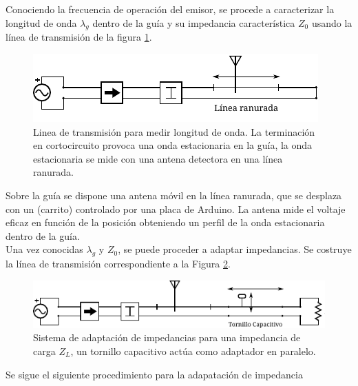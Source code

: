 \documentclass[11pt,a4paper]{article}
\begin{document}
\begin{multicols}{2}
Conociendo la frecuencia de operación del emisor, se procede a caracterizar la longitud de onda $\lambda_g$ dentro de la guía y su impedancia característica $Z_0$ usando la línea de transmisión de la figura \ref{fig:arr2}.\\ 

\begin{figure}[H]
    \centering
    \includegraphics[width=\linewidth]{Images/arreglo2.pdf}
    \caption{Linea de transmisión para medir longitud de onda. La terminación en cortocircuito provoca una onda estacionaria en la guía, la onda estacionaria se mide con una antena detectora en una línea ranurada.}
    \label{fig:arr2}
\end{figure}

Sobre la guía se dispone una antena móvil en la línea ranurada, que se desplaza con un (carrito) controlado por una placa de Arduino. 
La antena mide el voltaje eficaz en función de la posición obteniendo un perfil de la onda estacionaria dentro de la guía.\\ 

Una vez conocidas $\lambda_g$ y $Z_0$, se puede proceder a adaptar impedancias. Se costruye la línea de transmisión correspondiente a la Figura \ref{fig:arr4}.

\begin{figure}[H]
    \centering
    \includegraphics[width=\linewidth]{Images/arreglo4.pdf}
    \caption{Sistema de adaptación de impedancias para una impedancia de carga $Z_L$, un tornillo capacitivo actúa como adaptador en paralelo.}
    \label{fig:arr4}
\end{figure}

Se sigue el siguiente procedimiento para la adapatación de impedancia


\end{multicols}
\end{document}
